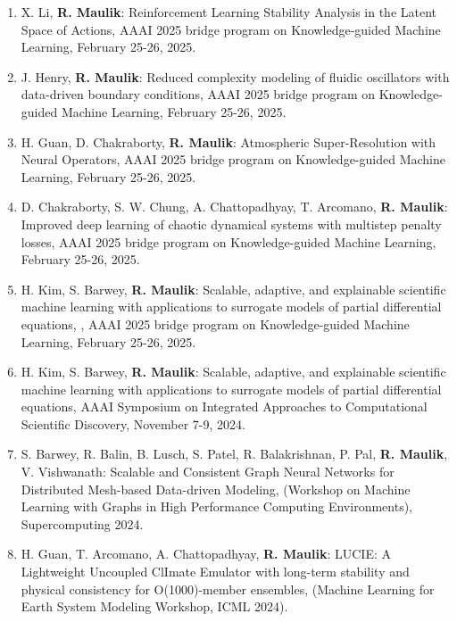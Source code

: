 \documentclass[letterpaper]{article}
\begin{document}
\begin{enumerate}

\item X. Li, \textbf{R. Maulik}: Reinforcement Learning Stability Analysis in the Latent Space of Actions, AAAI 2025 bridge program on Knowledge-guided Machine Learning, February 25-26, 2025.

\item J. Henry, \textbf{R. Maulik}: Reduced complexity modeling of fluidic oscillators with data-driven boundary conditions, AAAI 2025 bridge program on Knowledge-guided Machine Learning, February 25-26, 2025.

\item H. Guan, D. Chakraborty, \textbf{R. Maulik}: Atmospheric Super-Resolution with Neural Operators, AAAI 2025 bridge program on Knowledge-guided Machine Learning, February 25-26, 2025.

\item D. Chakraborty, S. W. Chung, A. Chattopadhyay, T. Arcomano, \textbf{R. Maulik}: Improved deep learning of chaotic dynamical systems with multistep penalty losses, AAAI 2025 bridge program on Knowledge-guided Machine Learning, February 25-26, 2025.

\item H. Kim,  S. Barwey, \textbf{R. Maulik}: Scalable, adaptive, and explainable scientific machine learning with applications to surrogate models of partial differential equations, , AAAI 2025 bridge program on Knowledge-guided Machine Learning, February 25-26, 2025.

\item H. Kim, S. Barwey, \textbf{R. Maulik}: Scalable, adaptive, and explainable scientific machine learning with applications to surrogate models of partial differential equations, AAAI Symposium on Integrated Approaches to Computational Scientific Discovery, November 7-9, 2024.

\item S. Barwey, R. Balin, B. Lusch, S. Patel, R. Balakrishnan, P. Pal, \textbf{R. Maulik}, V. Vishwanath: Scalable and Consistent Graph Neural Networks for Distributed Mesh-based Data-driven Modeling, (Workshop on Machine Learning with Graphs in High Performance Computing Environments), Supercomputing 2024.

\item H. Guan, T. Arcomano, A. Chattopadhyay, \textbf{R. Maulik}: LUCIE: A Lightweight Uncoupled ClImate Emulator with long-term stability and physical consistency for O(1000)-member ensembles, (Machine Learning for Earth System Modeling Workshop, ICML 2024).


\end{enumerate}
\end{document}
